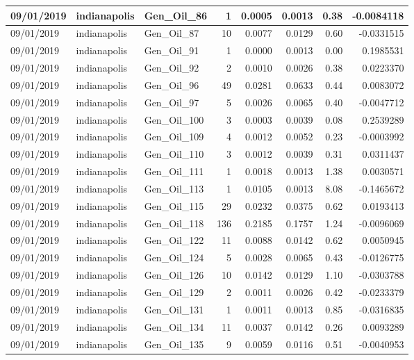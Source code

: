 \documentclass[
  letterpaper,
  DIV=11,
  numbers=noendperiod]{scrartcl}
\begin{document}
\begin{tabular}{l|l|l|r|r|r|r|r}
\hline
09/01/2019 & indianapolis & Gen\_Oil\_86 & 1 & 0.0005 & 0.0013 & 0.38 & -0.0084118\\
\hline
09/01/2019 & indianapolis & Gen\_Oil\_87 & 10 & 0.0077 & 0.0129 & 0.60 & -0.0331515\\
\hline
09/01/2019 & indianapolis & Gen\_Oil\_91 & 1 & 0.0000 & 0.0013 & 0.00 & 0.1985531\\
\hline
09/01/2019 & indianapolis & Gen\_Oil\_92 & 2 & 0.0010 & 0.0026 & 0.38 & 0.0223370\\
\hline
09/01/2019 & indianapolis & Gen\_Oil\_96 & 49 & 0.0281 & 0.0633 & 0.44 & 0.0083072\\
\hline
09/01/2019 & indianapolis & Gen\_Oil\_97 & 5 & 0.0026 & 0.0065 & 0.40 & -0.0047712\\
\hline
09/01/2019 & indianapolis & Gen\_Oil\_100 & 3 & 0.0003 & 0.0039 & 0.08 & 0.2539289\\
\hline
09/01/2019 & indianapolis & Gen\_Oil\_109 & 4 & 0.0012 & 0.0052 & 0.23 & -0.0003992\\
\hline
09/01/2019 & indianapolis & Gen\_Oil\_110 & 3 & 0.0012 & 0.0039 & 0.31 & 0.0311437\\
\hline
09/01/2019 & indianapolis & Gen\_Oil\_111 & 1 & 0.0018 & 0.0013 & 1.38 & 0.0030571\\
\hline
09/01/2019 & indianapolis & Gen\_Oil\_113 & 1 & 0.0105 & 0.0013 & 8.08 & -0.1465672\\
\hline
09/01/2019 & indianapolis & Gen\_Oil\_115 & 29 & 0.0232 & 0.0375 & 0.62 & 0.0193413\\
\hline
09/01/2019 & indianapolis & Gen\_Oil\_118 & 136 & 0.2185 & 0.1757 & 1.24 & -0.0096069\\
\hline
09/01/2019 & indianapolis & Gen\_Oil\_122 & 11 & 0.0088 & 0.0142 & 0.62 & 0.0050945\\
\hline
09/01/2019 & indianapolis & Gen\_Oil\_124 & 5 & 0.0028 & 0.0065 & 0.43 & -0.0126775\\
\hline
09/01/2019 & indianapolis & Gen\_Oil\_126 & 10 & 0.0142 & 0.0129 & 1.10 & -0.0303788\\
\hline
09/01/2019 & indianapolis & Gen\_Oil\_129 & 2 & 0.0011 & 0.0026 & 0.42 & -0.0233379\\
\hline
09/01/2019 & indianapolis & Gen\_Oil\_131 & 1 & 0.0011 & 0.0013 & 0.85 & -0.0316835\\
\hline
09/01/2019 & indianapolis & Gen\_Oil\_134 & 11 & 0.0037 & 0.0142 & 0.26 & 0.0093289\\
\hline
09/01/2019 & indianapolis & Gen\_Oil\_135 & 9 & 0.0059 & 0.0116 & 0.51 & -0.0040953\\

\end{tabular}
\end{document}
